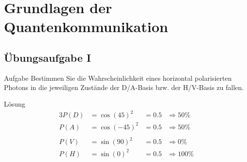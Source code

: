 \section{Grundlagen der Quantenkommunikation}
\begin{frame}

\end{frame}

\subsection{{\"U}bungsaufgabe I}
\begin{frame}[allowframebreaks]
	\begin{block}{Aufgabe}
		Bestimmen Sie die Wahrscheinlichkeit eines horizontal polarisierten Photons in die jeweiligen Zust{\"a}nde der D/A-Basis bzw. der H/V-Basis zu fallen.
	\end{block}
\end{frame}
\begin{frame}[allowframebreaks]
	\begin{block}{L{\"o}sung}
		\begin{alignat*}{3}
			P(D) &= \cos(45)^2 &= 0.5 &\Rightarrow 50\% \\
			P(A) &= \cos(-45)^2 &= 0.5 &\Rightarrow 50\% \\
		\\
			P(V) &= \sin(90)^2 &= 0.5 &\Rightarrow 0\% \\
			P(H) &= \sin(0)^2 &= 0.5 &\Rightarrow 100\%
		\end{alignat*}
	\end{block}
\end{frame}
